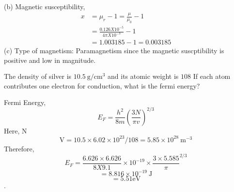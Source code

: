 \begin{enumerate}
\begin{answer}
\begin{align*}
		\end{align*}
		(b) Magnetic susceptibility,
		\begin{align*}
		x&=\mu_{r}-1=\frac{\mu}{\mu_{0}}-1\\&=\frac{0.126 X 10^{-5}}{4 \pi X 10^{-7}}-1\\&=1.003185-1=0.003185
		\end{align*}
		(c) Type of magnetism: Paramagnetism since the magnetic suscptibility is positive and low in magnitude.
	\end{answer}
	\begin{minipage}{\textwidth}
		\item The density of silver is $10.5 \mathrm{~g} / \mathrm{cm}^{3}$  and its atomic weight is  $108$ If each atom contributes one electron for conduction, what is the fermi energy?
	\end{minipage}
	\begin{answer}
		Fermi Energy, $$E_{F}=\frac{h^{2}}{8 m}\left(\frac{3 N}{\pi v}\right)^{2 / 3}$$
		Here, N $$ \mathrm{V}=10.5 \times 6.02 \times 10^{23} / 108
		=5.85 \times 10^{28} \mathrm{~m}^{-3}$$
		Therefore, $$E_{F}=\frac{6.626 \times 6.626}{8 X 9.1} \times 10^{-19} \times \frac{3 \times 5.585}{\pi}^{2 / 3}$$  $$=8.816 \times 10^{-19} \mathrm{~J}$$
		$$=5.51 \mathrm{eV}$$.	
	\end{answer}
\end{enumerate}